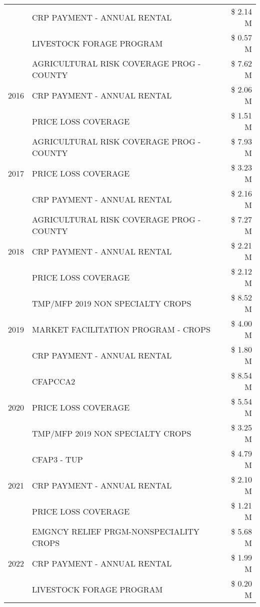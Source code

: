 \begin{tabular}{llr}
 & CRP PAYMENT - ANNUAL RENTAL & \$ 2.14 M \\
 & LIVESTOCK FORAGE PROGRAM & \$ 0.57 M \\
\cline{1-3}
\multirow[t]{3}{*}{2016} & AGRICULTURAL RISK COVERAGE PROG - COUNTY & \$ 7.62 M \\
 & CRP PAYMENT - ANNUAL RENTAL & \$ 2.06 M \\
 & PRICE LOSS COVERAGE & \$ 1.51 M \\
\cline{1-3}
\multirow[t]{3}{*}{2017} & AGRICULTURAL RISK COVERAGE PROG - COUNTY & \$ 7.93 M \\
 & PRICE LOSS COVERAGE & \$ 3.23 M \\
 & CRP PAYMENT - ANNUAL RENTAL & \$ 2.16 M \\
\cline{1-3}
\multirow[t]{3}{*}{2018} & AGRICULTURAL RISK COVERAGE PROG - COUNTY & \$ 7.27 M \\
 & CRP PAYMENT - ANNUAL RENTAL & \$ 2.21 M \\
 & PRICE LOSS COVERAGE & \$ 2.12 M \\
\cline{1-3}
\multirow[t]{3}{*}{2019} & TMP/MFP 2019 NON SPECIALTY CROPS & \$ 8.52 M \\
 & MARKET FACILITATION PROGRAM - CROPS & \$ 4.00 M \\
 & CRP PAYMENT - ANNUAL RENTAL & \$ 1.80 M \\
\cline{1-3}
\multirow[t]{3}{*}{2020} & CFAPCCA2 & \$ 8.54 M \\
 & PRICE LOSS COVERAGE & \$ 5.54 M \\
 & TMP/MFP 2019 NON SPECIALTY CROPS & \$ 3.25 M \\
\cline{1-3}
\multirow[t]{3}{*}{2021} & CFAP3 - TUP & \$ 4.79 M \\
 & CRP PAYMENT - ANNUAL RENTAL & \$ 2.10 M \\
 & PRICE LOSS COVERAGE & \$ 1.21 M \\
\cline{1-3}
\multirow[t]{3}{*}{2022} & EMGNCY RELIEF PRGM-NONSPECIALITY CROPS & \$ 5.68 M \\
 & CRP PAYMENT - ANNUAL RENTAL & \$ 1.99 M \\
 & LIVESTOCK FORAGE PROGRAM & \$ 0.20 M \\
\cline{1-3}
\bottomrule
\end{tabular}
